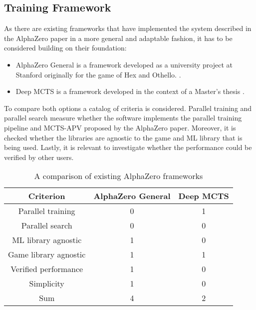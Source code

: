 \subsection{Training Framework}
\label{training_framework}
As there are existing frameworks that have implemented the system described in the AlphaZero paper in a more general and adaptable fashion, it has to be considered building on their foundation:
\begin{itemize}
    \item AlphaZero General is a framework developed as a university project at Stanford originally for the game of Hex and Othello. \cite{thakoor_learning_nodate,thakoor_suragnairalpha-zero-general_nodate}.
    \item Deep MCTS is a framework developed in the context of a Master's thesis \cite{bruasdal_deep_2020,henribru_deep_2021}.
\end{itemize}

To compare both options a catalog of criteria is considered. Parallel training and parallel search measure whether the software implements the parallel training pipeline and MCTS-APV proposed by the AlphaZero paper. Moreover, it is checked whether the libraries are agnostic to the game and ML library that is being used. Lastly, it is relevant to investigate whether the performance could be verified by other users.

\begin{table*}
    \begin{center}
        \begin{tabular}{ c|c|c }
            Criterion             & AlphaZero General & Deep MCTS \\
            \hline
            \hline
            Parallel training     & 0                 & 1         \\
            Parallel search       & 0                 & 0         \\
            ML library agnostic   & 1                 & 0         \\
            Game library agnostic & 1                 & 1         \\
            Verified performance  & 1                 & 0         \\
            Simplicity            & 1                 & 0         \\
            \hline
            \hline
            Sum                   & 4                 & 2         \\
        \end{tabular}
    \end{center}
    \caption{A comparison of existing AlphaZero frameworks}\label{training_framework_comparison}
\end{table*}

